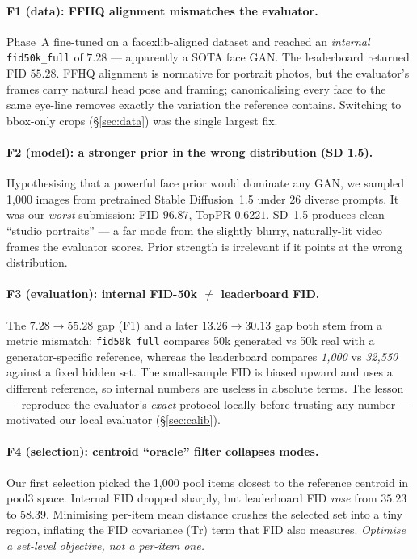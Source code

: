\documentclass{article}
\begin{document}
\paragraph{F1 (data): FFHQ alignment mismatches the evaluator.} Phase~A
fine-tuned on a facexlib-aligned dataset and reached an \emph{internal}
\texttt{fid50k\_full} of $7.28$ --- apparently a SOTA face GAN. The leaderboard
returned FID $55.28$. FFHQ alignment is normative for portrait photos, but the
evaluator's frames carry natural head pose and framing; canonicalising every
face to the same eye-line removes exactly the variation the reference contains.
Switching to bbox-only crops (\S\ref{sec:data}) was the single largest fix.

\paragraph{F2 (model): a stronger prior in the wrong distribution (SD 1.5).}
Hypothesising that a powerful face prior would dominate any GAN, we sampled
1,000 images from pretrained Stable Diffusion~1.5 \citep{rombach2022high} under
26 diverse prompts. It was our \emph{worst} submission: FID $96.87$, TopPR
$0.6221$. SD~1.5 produces clean ``studio portraits'' --- a far mode from the
slightly blurry, naturally-lit video frames the evaluator scores. Prior strength
is irrelevant if it points at the wrong distribution.

\paragraph{F3 (evaluation): internal FID-50k $\neq$ leaderboard FID.} The
$7.28\!\to\!55.28$ gap (F1) and a later $13.26\!\to\!30.13$ gap both stem from a
metric mismatch: \texttt{fid50k\_full} compares 50k generated vs 50k real with a
generator-specific reference, whereas the leaderboard compares \emph{1,000} vs
\emph{32,550} against a fixed hidden set. The small-sample FID is biased upward
and uses a different reference, so internal numbers are useless in absolute
terms. The lesson --- reproduce the evaluator's \emph{exact} protocol locally
before trusting any number --- motivated our local evaluator (\S\ref{sec:calib}).

\paragraph{F4 (selection): centroid ``oracle'' filter collapses modes.} Our
first selection picked the 1,000 pool items closest to the reference centroid in
pool3 space. Internal FID dropped sharply, but leaderboard FID \emph{rose} from
$35.23$ to $58.39$. Minimising per-item mean distance crushes the selected set
into a tiny region, inflating the FID covariance ($\mathrm{Tr}$) term that FID
also measures. \emph{Optimise a set-level objective, not a per-item one.}
\end{document}
